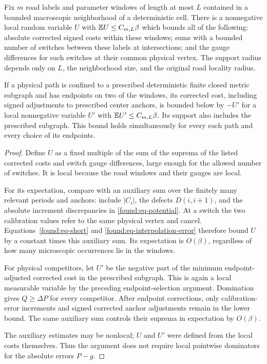 \begin{lemma}
\label{found:lem-envelope}
Fix $m$ road labels and parameter windows of length at most $L$ contained
in a bounded macroscopic neighborhood of a deterministic cell.  There
is a nonnegative local random variable $U$ with
$\mathbb E U\leq C_{m,L}\beta$ which bounds all of the following:
absolute corrected signed costs within these windows; sums with a
bounded number of switches between these labels at intersections; and
the gauge differences for such switches at their common physical
vertex.  The support radius depends only on $L$, the
neighborhood size, and the original road locality radius.

If a physical path is confined to a prescribed deterministic finite
closed metric subgraph and has endpoints on two of the windows,
its corrected cost, including signed adjustments to prescribed center
anchors, is bounded below by $-U'$ for a local nonnegative variable
$U'$ with $\mathbb E U'\leq C_{m,L}\beta$.  Its support also includes
the prescribed subgraph.  This bound holds simultaneously for every such
path and every choice of its endpoints.
\end{lemma}

\begin{proof}
Define $U$ as a fixed multiple of the sum of the suprema of the listed
corrected costs and switch gauge differences, large enough for the
allowed number of switches.  It is local because the road windows
and their gauges are local.

For its expectation, compare with an auxiliary sum over the finitely
many relevant periods and anchors: include $|C_i|$, the defects
$D(i,i+1)$, and the absolute increment discrepancies in
\eqref{found:eq-potential}.  At a switch the two calibration values
refer to the same physical vertex and cancel.
Equations~\eqref{found:eq-short} and
\eqref{found:eq-interpolation-error} therefore bound $U$ by a constant
times this auxiliary sum.  Its expectation is $O(\beta)$, regardless
of how many microscopic occurrences lie in the windows.

For physical competitors, let $U'$ be the negative part of the minimum
endpoint-adjusted corrected cost in the prescribed subgraph.  This is
again a local measurable variable by the preceding endpoint-selection
argument. Domination gives $Q\ge\Delta P$ for
every competitor.  After endpoint corrections, only calibration-error
increments and signed corrected anchor adjustments remain in the
lower bound.  The same auxiliary sum controls their suprema in
expectation by $O(\beta)$.

The auxiliary estimates may be nonlocal; $U$ and $U'$ were defined
from the local costs themselves.  Thus the argument does not require
local pointwise dominators for the absolute errors $P-g$.
\end{proof}

